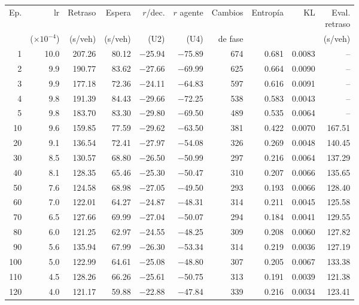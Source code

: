 \begin{table}[H]
\centering
\scriptsize
\setlength{\tabcolsep}{3pt}
\setlength{\tabcolsep}{2pt}
\begin{tabular}{rrrrrrrrrr}
\toprule
Ep. & lr & Retraso & Espera & $r$/dec. & $r$ agente & Cambios & Entropía & KL & \makecell{Eval.\\retraso} \\
 & ($\times 10^{-4}$) & (s/veh) & (s/veh) & (U2) & (U4) & de fase &  &  & (s/veh) \\
\midrule
1 & 10.0 & 207.26 & 80.12 & $-$25.94 & $-$75.89 & 674 & 0.681 & 0.0083 & -- \\
2 & 9.9 & 190.77 & 83.62 & $-$27.66 & $-$69.99 & 625 & 0.664 & 0.0090 & -- \\
3 & 9.9 & 177.18 & 72.36 & $-$24.11 & $-$64.83 & 597 & 0.616 & 0.0091 & -- \\
4 & 9.8 & 191.39 & 84.43 & $-$29.66 & $-$72.25 & 538 & 0.583 & 0.0043 & -- \\
5 & 9.8 & 183.70 & 83.30 & $-$29.80 & $-$69.50 & 489 & 0.535 & 0.0064 & -- \\
10 & 9.6 & 159.85 & 77.59 & $-$29.62 & $-$63.50 & 381 & 0.422 & 0.0070 & 167.51 \\
20 & 9.1 & 136.54 & 72.41 & $-$27.97 & $-$54.08 & 326 & 0.269 & 0.0048 & 140.45 \\
30 & 8.5 & 130.57 & 68.80 & $-$26.50 & $-$50.99 & 297 & 0.216 & 0.0064 & 137.29 \\
40 & 8.1 & 128.35 & 65.46 & $-$25.30 & $-$50.47 & 310 & 0.207 & 0.0066 & 135.65 \\
50 & 7.6 & 124.58 & 68.98 & $-$27.05 & $-$49.50 & 293 & 0.193 & 0.0066 & 128.40 \\
60 & 7.0 & 122.01 & 64.27 & $-$24.87 & $-$48.31 & 314 & 0.211 & 0.0045 & 125.58 \\
70 & 6.5 & 127.66 & 69.99 & $-$27.04 & $-$50.07 & 294 & 0.184 & 0.0041 & 129.55 \\
80 & 6.0 & 121.25 & 62.97 & $-$24.55 & $-$48.25 & 309 & 0.208 & 0.0060 & 127.82 \\
90 & 5.6 & 135.94 & 67.99 & $-$26.30 & $-$53.34 & 314 & 0.219 & 0.0036 & 127.19 \\
100 & 5.0 & 122.99 & 64.61 & $-$25.08 & $-$48.80 & 307 & 0.205 & 0.0067 & 133.38 \\
110 & 4.5 & 128.26 & 66.26 & $-$25.61 & $-$50.75 & 313 & 0.191 & 0.0039 & 121.38 \\
120 & 4.0 & 121.17 & 59.88 & $-$22.88 & $-$47.84 & 339 & 0.216 & 0.0034 & 123.41 \\

\end{tabular}
\end{table}
